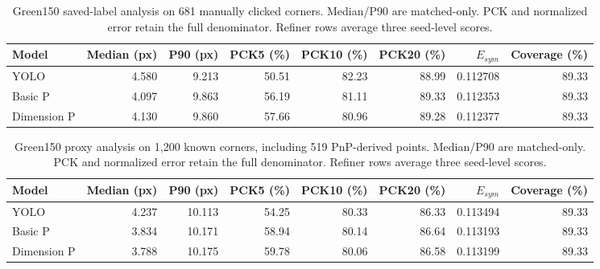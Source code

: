 \begin{table}[t]\centering
\caption{Green150 saved-label analysis on 681 manually clicked corners. Median/P90 are matched-only. PCK and normalized error retain the full denominator. Refiner rows average three seed-level scores.}
\begin{tabular}{lrrrrrrr}\toprule
Model & Median (px) & P90 (px) & PCK5 (\%) & PCK10 (\%) & PCK20 (\%) & $E_{sym}$ & Coverage (\%) \\ \midrule
YOLO & 4.580 & 9.213 & 50.51 & 82.23 & 88.99 & 0.112708 & 89.33 \\
Basic P & 4.097 & 9.863 & 56.19 & 81.11 & 89.33 & 0.112353 & 89.33 \\
Dimension P & 4.130 & 9.860 & 57.66 & 80.96 & 89.28 & 0.112377 & 89.33 \\
\bottomrule\end{tabular}
\label{tab:green-manual-only}
\end{table}
\begin{table}[t]\centering
\caption{Green150 proxy analysis on 1,200 known corners, including 519 PnP-derived points. Median/P90 are matched-only. PCK and normalized error retain the full denominator. Refiner rows average three seed-level scores.}
\begin{tabular}{lrrrrrrr}\toprule
Model & Median (px) & P90 (px) & PCK5 (\%) & PCK10 (\%) & PCK20 (\%) & $E_{sym}$ & Coverage (\%) \\ \midrule
YOLO & 4.237 & 10.113 & 54.25 & 80.33 & 86.33 & 0.113494 & 89.33 \\
Basic P & 3.834 & 10.171 & 58.94 & 80.14 & 86.64 & 0.113193 & 89.33 \\
Dimension P & 3.788 & 10.175 & 59.78 & 80.06 & 86.58 & 0.113199 & 89.33 \\
\bottomrule\end{tabular}
\label{tab:green-all-known-proxy}
\end{table}
